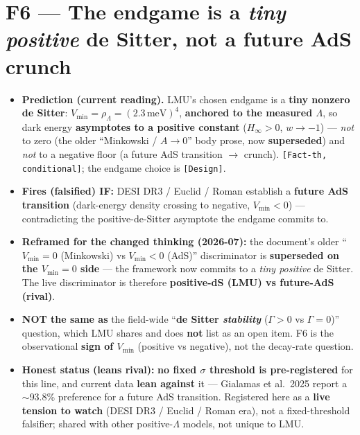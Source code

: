 \documentclass[11pt,a4paper]{article}
\newcommand{\st}[1]{\texttt{[#1]}}
\begin{document}
\section*{F6 --- The endgame is a \emph{tiny positive} de Sitter, not a future AdS crunch}
\begin{itemize}
\item \textbf{Prediction (current reading).} LMU's chosen endgame is a \textbf{tiny nonzero de Sitter}: $V_{\min}=\rho_\Lambda=(2.3\,\text{meV})^4$, \textbf{anchored to the measured $\Lambda$}, so dark energy \textbf{asymptotes to a positive constant} ($H_\infty>0$, $w\to-1$) --- \emph{not} to zero (the older ``Minkowski / $A\to0$'' body prose, now \textbf{superseded}) and \emph{not} to a negative floor (a future AdS transition $\to$ crunch). \st{Fact-th, conditional}; the endgame choice is \st{Design}.
\item \textbf{Fires (falsified) IF:} DESI DR3 / Euclid / Roman establish a \textbf{future AdS transition} (dark-energy density crossing to negative, $V_{\min}<0$) --- contradicting the positive-de-Sitter asymptote the endgame commits to.
\item \textbf{Reframed for the changed thinking (2026-07):} the document's older ``$V_{\min}=0$ (Minkowski) vs $V_{\min}<0$ (AdS)'' discriminator is \textbf{superseded on the $V_{\min}=0$ side} --- the framework now commits to a \emph{tiny positive} de Sitter. The live discriminator is therefore \textbf{positive-dS (LMU) vs future-AdS (rival)}.
\item \textbf{NOT the same as} the field-wide ``\textbf{de Sitter \emph{stability}} ($\Gamma>0$ vs $\Gamma=0$)'' question, which LMU shares and does \textbf{not} list as an open item. F6 is the observational \textbf{sign of $V_{\min}$} (positive vs negative), not the decay-rate question.
\item \textbf{Honest status (leans rival):} \textbf{no fixed $\sigma$ threshold is pre-registered} for this line, and current data \textbf{lean against} it --- Gialamas et al.\ 2025 report a $\sim$93.8\% preference for a future AdS transition. Registered here as a \textbf{live tension to watch} (DESI DR3 / Euclid / Roman era), not a fixed-threshold falsifier; shared with other positive-$\Lambda$ models, not unique to LMU.
\end{itemize}

\hrulefill
\end{document}
